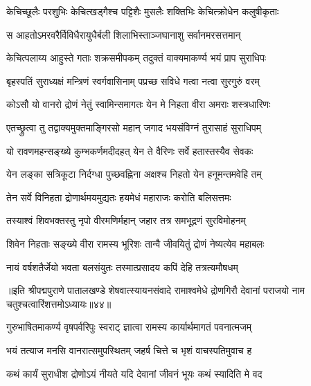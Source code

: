 \twolineshloka
{केचिच्छूलैः परशुभिः केचित्खड्गैश्च पट्टिशैः}
{मुसलैः शक्तिभिः केचित्क्रोधेन कलुषीकृताः}%

\twolineshloka
{स आहतोऽमरवरैर्विविधैरायुधैर्बली}
{शिलाभिस्ताञ्जघानाशु सर्वानमरसत्तमान्}%

\twolineshloka
{केचित्पलाय्य आहुस्ते गताः शक्रसमीपकम्}
{तदुक्तं वाक्यमाकर्ण्य भयं प्राप सुराधिपः}%

\twolineshloka
{बृहस्पतिं सुराध्यक्षं मन्त्रिणं स्वर्गवासिनाम्}
{पप्रच्छ सविधे गत्वा नत्वा सुरगुरुं वरम्}%


\twolineshloka
{कोऽसौ यो वानरो द्रोणं नेतुं स्वामिन्समागतः}
{येन मे निहता वीरा अमराः शस्त्रधारिणः}%


\twolineshloka
{एतच्छ्रुत्वा तु तद्वाक्यमुक्तमाङ्गिरसो महान्}
{जगाद भयसंविग्नं तुरासाहं सुराधिपम्}%


\twolineshloka
{यो रावणमहन्सङ्ख्ये कुम्भकर्णमदीदहत्}
{येन ते वैरिणः सर्वे हतास्तस्यैव सेवकः}%

\twolineshloka
{येन लङ्का सत्रिकूटा निर्दग्धा पुच्छवह्निना}
{अक्षश्च निहतो येन हनूमन्तमवेहि तम्}%

\twolineshloka
{तेन सर्वे विनिहता द्रोणार्थमयमुद्यतः}
{हयमेधं महाराजः करोति बलिसत्तमः}%

\twolineshloka
{तस्याश्वं शिवभक्तस्तु नृपो वीरमणिर्महान्}
{जहार तत्र समभूद्रणं सुरविमोहनम्}%

\twolineshloka
{शिवेन निहताः सङ्ख्ये वीरा रामस्य भूरिशः}
{तान्वै जीवयितुं द्रोणं नेष्यत्येव महाबलः}%

\twolineshloka
{नायं वर्षशतैर्जेयो भवता बलसंयुतः}
{तस्मात्प्रसादय कपिं देहि तत्रत्यमौषधम्}%

॥इति श्रीपद्मपुराणे पातालखण्डे शेषवात्स्यायनसंवादे रामाश्वमेधे द्रोणगिरौ देवानां पराजयो नाम चतुश्चत्वारिंशत्तमोऽध्यायः॥४४॥



\twolineshloka
{गुरुभाषितमाकर्ण्य वृषपर्वरिपुः स्वराट्}
{ज्ञात्वा रामस्य कार्यार्थमागतं पवनात्मजम्}%

\twolineshloka
{भयं तत्याज मनसि वानरात्समुपस्थितम्}
{जहर्ष चित्ते च भृशं वाचस्पतिमुवाच ह}%


\twolineshloka
{कथं कार्यं सुराधीश द्रोणोऽयं नीयते यदि}
{देवानां जीवनं भूयः कथं स्यादिति मे वद}%

